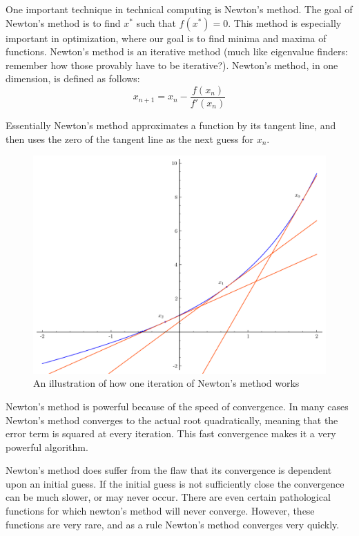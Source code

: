 \label{lab:NewtonsMethod}

One important technique in technical computing is Newton's method. The goal of Newton's method is to find $x^*$ such that $f(x^*) = 0$. This method is especially important in optimization, where our goal is to find minima and maxima of functions. Newton's method is an iterative method (much like eigenvalue finders: remember how those provably have to be iterative?). Newton's method, in one dimension, is defined as follows:
\[
x_{n+1} = x_n - \frac{f(x_n)}{f'(x_n)}
\]

Essentially Newton's method approximates a function by its tangent line, and then uses the zero of the tangent line as the next guess for $x_n$.

\begin{figure}[h]
\centering
\includegraphics[width=\textwidth]{newton_iters}
\caption{An illustration of how one iteration of Newton's method works}
\end{figure}

Newton's method is powerful because of the speed of convergence. In many cases Newton's method converges to the actual root quadratically, meaning that the error term is squared at every iteration. This fast convergence makes it a very powerful algorithm.

Newton's method does suffer from the flaw that its convergence is dependent upon an initial guess. If the initial guess is not sufficiently close the convergence can be much slower, or may never occur. There are even certain pathological functions for which newton's method will never converge. However, these functions are very rare, and as a rule Newton's method converges very quickly.



